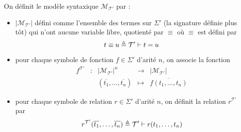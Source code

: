 \begin{definition}
  On définit le modèle syntaxique $\mathcal M_{\mathcal T'}$ par :
  \begin{itemize}
  \item $|\mathcal M_{\mathcal T'}|$ défini comme l'ensemble des termes sur
    $\Sigma'$ (la signature définie plus tôt) qui n'ont aucune variable libre,
    quotienté par $\equiv$ où $\equiv$ est défini par
    \[t\equiv u \triangleq \mathcal T'\vdash t = u\]
  \item pour chaque symbole de fonction $f\in\Sigma'$ d'arité $n$, on associe la
    fonction
    \[\begin{array}{ccccc}
    f^{\mathcal T'} & : & |\mathcal M_{\mathcal T'}|^n & \longrightarrow &
    |\mathcal M_{\mathcal T'}|\\
    & & (\overline{t_1},\ldots,\overline{t_n}) & \longmapsto &
    \overline{f(t_1,\ldots,t_n)}
    \end{array}\]
  \item pour chaque symbole de relation $r\in\Sigma'$ d'arité $n$, on définit la
    relation $r^{\mathcal T'}$ par
    \[r^{\mathcal T'}(\overline{t_1},\ldots,\overline{t_n}) \triangleq
    \mathcal T'\vdash r(t_1,\ldots,t_n)\]
  \end{itemize}
\end{definition}

